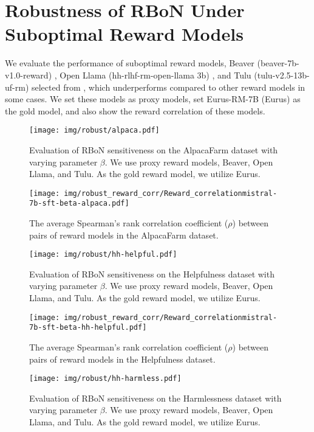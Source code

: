 \newpage
\section{Robustness of RBoN Under Suboptimal Reward Models}
We evaluate the performance of suboptimal reward models, Beaver (beaver-7b-v1.0-reward) \citep{dai2024safe}, Open Llama (hh-rlhf-rm-open-llama 3b) \citep{diao-etal-2024-lmflow}, and Tulu (tulu-v2.5-13b-uf-rm) \citep{ivison2024unpacking} selected from \cite{RewardBench}, which underperforms compared to other reward models in some cases. We set these models as proxy models, set Eurus-RM-7B (Eurus) as the gold model, and also show the reward correlation of these models.
\begin{figure}[htbp]
    \centering
    \texttt{[image: img/robust/alpaca.pdf]}
    \caption{
    Evaluation of RBoN sensitiveness on the AlpacaFarm dataset with varying parameter $\beta$. We use proxy reward models, Beaver, Open Llama, and Tulu. As the gold reward model, we utilize Eurus.
    }
\end{figure}

\begin{figure}[htbp]
    \centering
    \texttt{[image: img/robust\_reward\_corr/Reward\_correlationmistral-7b-sft-beta-alpaca.pdf]}
    \caption{
    The average Spearman's rank correlation coefficient ($\rho$) between pairs of reward models in the AlpacaFarm dataset.
    }
\end{figure}

\begin{figure}[htbp]
    \centering
    \texttt{[image: img/robust/hh-helpful.pdf]}
    \caption{
    Evaluation of RBoN sensitiveness on the Helpfulness dataset with varying parameter $\beta$. We use proxy reward models, Beaver, Open Llama, and Tulu. As the gold reward model, we utilize Eurus.
    }
\end{figure}

\begin{figure}[htbp]
    \centering
    \texttt{[image: img/robust\_reward\_corr/Reward\_correlationmistral-7b-sft-beta-hh-helpful.pdf]}
    \caption{
    The average Spearman's rank correlation coefficient ($\rho$) between pairs of reward models in the Helpfulness dataset.
    }
\end{figure}


\begin{figure}[htbp]
    \centering
    \texttt{[image: img/robust/hh-harmless.pdf]}
    \caption{
    Evaluation of RBoN sensitiveness on the Harmlessness dataset with varying parameter $\beta$. We use proxy reward models, Beaver, Open Llama, and Tulu. As the gold reward model, we utilize Eurus.
    }
\end{figure}

